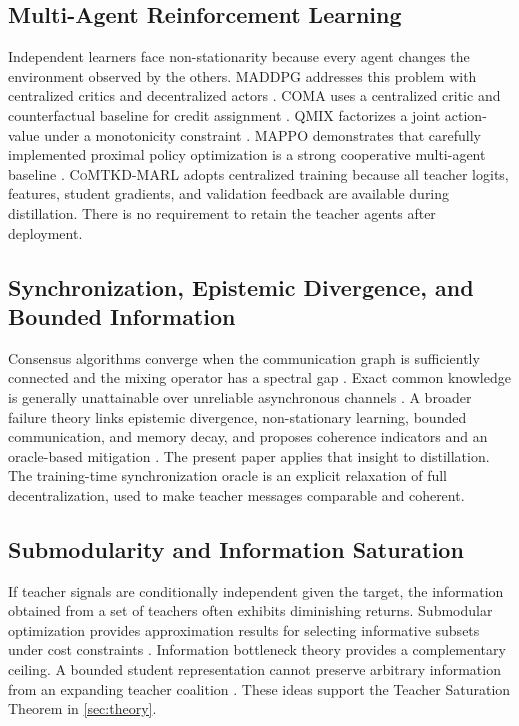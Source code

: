 \documentclass[10pt,twocolumn,a4paper]{article}
\newcommand{\CoMTKD}{\textsc{CoMTKD-MARL}\xspace}
\begin{document}
\subsection{Multi-Agent Reinforcement Learning}

Independent learners face non-stationarity because every agent changes the environment observed by the others. MADDPG addresses this problem with centralized critics and decentralized actors \cite{lowe2017}. COMA uses a centralized critic and counterfactual baseline for credit assignment \cite{foerster2018}. QMIX factorizes a joint action-value under a monotonicity constraint \cite{rashid2018}. MAPPO demonstrates that carefully implemented proximal policy optimization is a strong cooperative multi-agent baseline \cite{yu2022}. \CoMTKD adopts centralized training because all teacher logits, features, student gradients, and validation feedback are available during distillation. There is no requirement to retain the teacher agents after deployment.

\subsection{Synchronization, Epistemic Divergence, and Bounded Information}

Consensus algorithms converge when the communication graph is sufficiently connected and the mixing operator has a spectral gap \cite{olfati2007,boyd2006}. Exact common knowledge is generally unattainable over unreliable asynchronous channels \cite{halpern1990}. A broader failure theory links epistemic divergence, non-stationary learning, bounded communication, and memory decay, and proposes coherence indicators and an oracle-based mitigation \cite{chiurunge2026}. The present paper applies that insight to distillation. The training-time synchronization oracle is an explicit relaxation of full decentralization, used to make teacher messages comparable and coherent.

\subsection{Submodularity and Information Saturation}

If teacher signals are conditionally independent given the target, the information obtained from a set of teachers often exhibits diminishing returns. Submodular optimization provides approximation results for selecting informative subsets under cost constraints \cite{nemhauser1978,krause2014}. Information bottleneck theory provides a complementary ceiling. A bounded student representation cannot preserve arbitrary information from an expanding teacher coalition \cite{tishby1999,cover2006}. These ideas support the Teacher Saturation Theorem in \cref{sec:theory}.
\end{document}
